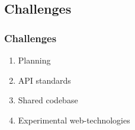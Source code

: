 \subsection{Challenges}
\begin{frame}\frametitle{Challenges}
	\begin{enumerate}
	    \item Planning
	    \item API standards
	    \item Shared codebase
	    \item Experimental web-technologies
	\end{enumerate}
	
\end{frame}

